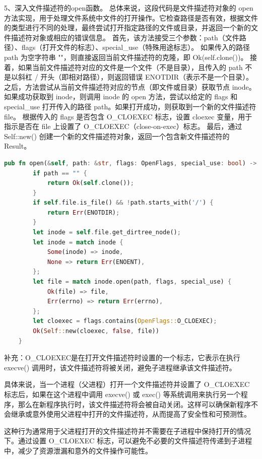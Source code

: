 5、深入文件描述符的open函数。
总体来说，这段代码是文件描述符对象的 open 方法实现，用于处理文件系统中文件的打开操作。它检查路径是否有效，根据文件的类型进行不同的处理，最终尝试打开指定路径的文件或目录，并返回一个新的文件描述符对象或相应的错误信息。
首先，该方法接受三个参数：path（文件路径）、flags（打开文件的标志）、special_use（特殊用途标志）。
如果传入的路径 path 为空字符串 ""，则直接返回当前文件描述符的克隆，即 Ok(self.clone())。
接着，如果当前文件描述符对应的文件是一个文件（不是目录），且传入的 path 不是以斜杠 / 开头（即相对路径），则返回错误 ENOTDIR（表示不是一个目录）。
之后，方法尝试从当前文件描述符对应的节点（即文件或目录）获取节点 inode。
如果成功获取到 inode，则调用 inode 的 open 方法，尝试以给定的 flags 和 special_use 打开传入的路径 path。如果打开成功，则获取到一个新的文件描述符 file。
根据传入的 flags 是否包含 O_CLOEXEC 标志，设置 cloexec 变量，用于指示是否在 file 上设置了 O_CLOEXEC（close-on-exec）标志。
最后，通过 Self::new() 创建一个新的文件描述符对象，返回一个包含新文件描述符的 Result。

\begin{lstlisting}[language={Rust}, 
    caption={文件描述符的open函数}]
    pub fn open(&self, path: &str, flags: OpenFlags, special_use: bool) -> Result<Self, isize> {
        if path == "" {
            return Ok(self.clone());
        }
        if self.file.is_file() && !path.starts_with('/') {
            return Err(ENOTDIR);
        }
        let inode = self.file.get_dirtree_node();
        let inode = match inode {
            Some(inode) => inode,
            None => return Err(ENOENT),
        };
        let file = match inode.open(path, flags, special_use) {
            Ok(file) => file,
            Err(errno) => return Err(errno),
        };
        let cloexec = flags.contains(OpenFlags::O_CLOEXEC);
        Ok(Self::new(cloexec, false, file))
    }
\end{lstlisting}

补充：O_CLOEXEC是在打开文件描述符时设置的一个标志，它表示在执行  execve()  调用时，该文件描述符将被关闭，避免子进程继承该文件描述符。

具体来说，当一个进程（父进程）打开一个文件描述符并设置了  O_CLOEXEC  标志后，如果在这个进程中调用  execve()  或  exec()  等系统调用来执行另一个程序，那么在新程序执行时，该文件描述符将会被自动关闭。这样可以确保新程序不会继承或意外使用父进程中打开的文件描述符，从而提高了安全性和可预测性。

这种行为通常用于父进程打开的文件描述符并不需要在子进程中保持打开的情况下。通过设置  O_CLOEXEC  标志，可以避免不必要的文件描述符传递到子进程中，减少了资源泄漏和意外的文件操作可能性。

